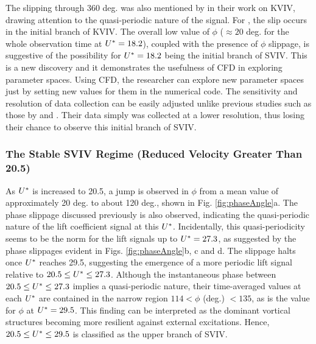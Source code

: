 \documentclass[oneside]{utmthesis}
\begin{document}
The slipping through 360 deg. was also mentioned by \citet{Khalak1999} in their work on KVIV, drawing attention to the quasi-periodic nature of the signal. For \citet{Khalak1999}, the slip occurs in the initial branch of KVIV. The overall low value of $\phi$ ($\approx 20$ deg. for the whole observation time at $U^{*} = 18.2$), coupled with the presence of $\phi$ slippage, is suggestive of the possibility for $U^{*} = 18.2$ being the initial branch of SVIV. This is a new discovery and it demonstrates the usefulness of CFD in exploring parameter spaces. Using CFD, the researcher can explore new parameter spaces just by setting new values for them in the numerical code. The sensitivity and resolution of data collection can be easily adjusted unlike previous studies such as those by \citet{Koide2009} and \citet{Koide2013}. Their data simply was collected at a lower resolution, thus losing their chance to observe this initial branch of SVIV.

\subsubsection{The Stable SVIV Regime (Reduced Velocity Greater Than 20.5)} \label{sssec:svivRegime}

As $U^{*}$ is increased to 20.5, a jump is observed in $\phi$ from a mean value of approximately 20 deg. to about 120 deg., shown in Fig. \ref{fig:phaseAngle}a. The phase slippage discussed previously is also observed, indicating the quasi-periodic nature of the lift coefficient signal at this $U^{*}$. Incidentally, this quasi-periodicity seems to be the norm for the lift signals up to $U^{*} = 27.3$, as suggested by the phase slippages evident in Figs. \ref{fig:phaseAngle}b, c and d. The slippage halts once $U^{*}$ reaches 29.5, suggesting the emergence of a more periodic lift signal relative to $20.5 \leq U^{*} \leq 27.3$. Although the instantaneous phase between $20.5 \leq U^{*} \leq 27.3$ implies a quasi-periodic nature, their time-averaged values at each $U^{*}$ are contained in the narrow region $114 < \phi$ (deg.) $< 135$, as is the value for $\phi$ at $U^{*} = 29.5$. This finding can be interpreted as the dominant vortical structures becoming more resilient against external excitations. Hence, $20.5 \leq U^{*} \leq 29.5$ is classified as the upper branch of SVIV.
\end{document}

